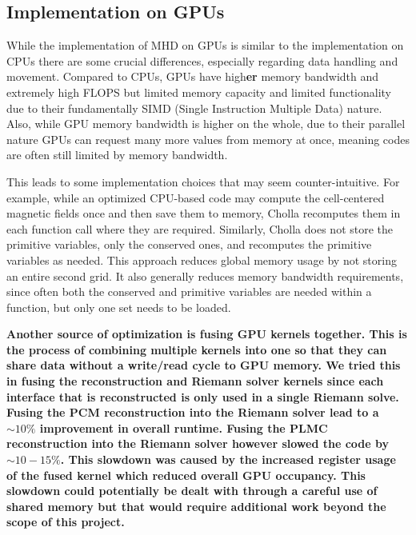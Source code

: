 \documentclass[modern, linenumbers]{aastex631}
\begin{document}
\subsection{Implementation on GPUs}
\label{sec:gpu-vs-cpu}

While the implementation of MHD on GPUs is similar to the implementation on CPUs there are some crucial differences, especially regarding data handling and movement. Compared to CPUs, GPUs have high\textbf{er} memory bandwidth and extremely high FLOPS but limited memory capacity and limited functionality due to their fundamentally SIMD (Single Instruction Multiple Data) nature. Also, while GPU memory bandwidth is higher on the whole, due to their parallel nature GPUs can request many more values from memory at once, meaning codes are often still limited by memory bandwidth.

This leads to some implementation choices that may seem counter-intuitive. For example, while an optimized CPU-based code may compute the cell-centered magnetic fields once and then save them to memory, Cholla recomputes them in each function call where they are required. Similarly, Cholla does not store the primitive variables, only the conserved ones, and recomputes the primitive variables as needed. This approach reduces global memory usage by not storing an entire second grid. It also generally reduces memory bandwidth requirements, since often both the conserved and primitive variables are needed within a function, but only one set needs to be loaded.

\textbf{Another source of optimization is fusing GPU kernels together. This is the process of combining multiple kernels into one so that they can share data without a write/read cycle to GPU memory. We tried this in fusing the reconstruction and Riemann solver kernels since each interface that is reconstructed is only used in a single Riemann solve. Fusing the PCM reconstruction into the Riemann solver lead to a $\sim 10\%$ improvement in overall runtime. Fusing the PLMC reconstruction into the Riemann solver however slowed the code by $\sim 10-15\%$. This slowdown was caused by the increased register usage of the fused kernel which reduced overall GPU occupancy. This slowdown could potentially be dealt with through a careful use of shared memory but that would require additional work beyond the scope of this project.}
\end{document}
